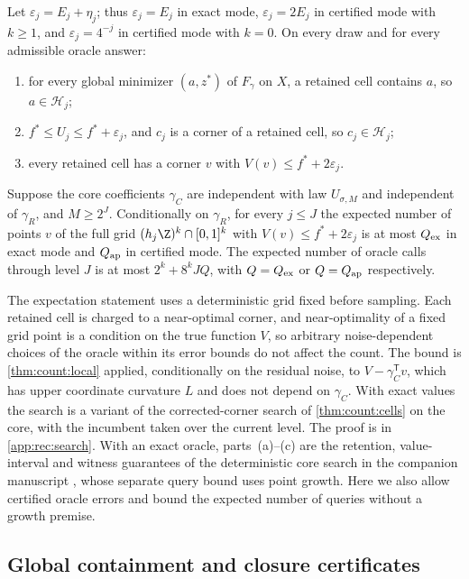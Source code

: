 \begin{proposition}\label{prop:rec:search}
Let $\varepsilon_j=E_j+\eta_j$; thus $\varepsilon_j=E_j$ in exact mode,
$\varepsilon_j=2E_j$ in certified mode with $k\ge1$, and
$\varepsilon_j=4^{-j}$ in certified mode with $k=0$. On every draw and for
every admissible oracle answer:
\begin{enumerate}[label=(\alph*)]
\item for every global minimizer $(a,z^*)$ of $F_\gamma$ on $X$, a retained
cell contains $a$, so $a\in\mathcal H_j$;
\item $f^*\le U_j\le f^*+\varepsilon_j$, and $c_j$ is a corner of a retained
cell, so $c_j\in\mathcal H_j$;
\item every retained cell has a corner $v$ with $V(v)\le f^*+2\varepsilon_j$.
\end{enumerate}
Suppose the core coefficients $\gamma_C$ are independent with law
$U_{\sigma,M}$ and independent of $\gamma_R$, and $M\ge2^J$. Conditionally
on $\gamma_R$, for every $j\le J$ the expected number of points $v$ of the
full grid $(h_j\Z)^k\cap[0,1]^k$ with $V(v)\le f^*+2\varepsilon_j$ is at most
$Q_{\rm ex}$ in exact mode and $Q_{\rm ap}$ in certified mode. The expected
number of oracle calls through level $J$ is at most $2^k+8^kJQ$, with
$Q=Q_{\rm ex}$ or $Q=Q_{\rm ap}$ respectively.
\end{proposition}

The expectation statement uses a deterministic grid fixed before sampling.
Each retained cell is charged to a near-optimal corner, and near-optimality
of a fixed grid point is a condition on the true function $V$, so arbitrary
noise-dependent choices of the oracle within its error bounds do not affect
the count. The bound is \cref{thm:count:local} applied, conditionally on the
residual noise, to $V-\gamma_C^{\mathsf T}v$, which has upper coordinate
curvature $L$ and does not depend on $\gamma_C$. With exact values the search
is a variant of the corrected-corner search of \cref{thm:count:cells} on the
core, with the incumbent taken over the current level. The proof is in
\cref{app:rec:search}. With an exact oracle, parts~(a)--(c) are the
retention, value-interval and witness guarantees of the deterministic core
search in the companion manuscript \citep{companion-decomposition-aware},
whose separate query bound uses point growth. Here we also allow certified
oracle errors and bound the expected number of queries without a growth
premise.

\subsection{Global containment and closure certificates}\label{sec:rec:certificates}

